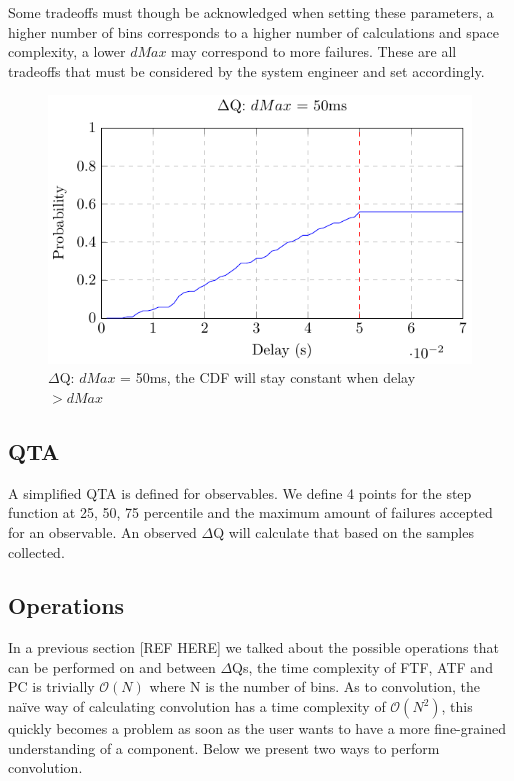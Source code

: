 Some tradeoffs must though be acknowledged when setting these parameters, a higher number of bins corresponds to a higher number of calculations and space complexity, a lower $dMax$ may correspond to more failures. These are all tradeoffs that must be considered by the system engineer and set accordingly.
    \begin{figure}[H]
        \begin{center}
            \includegraphics[scale = 1.4]{tikz/cdf_dmax.pdf}
        \end{center}
        \caption{$\Delta$Q: $dMax$ = 50ms, the CDF will stay constant when delay $> dMax$}
    \end{figure}

    \subsection{QTA}
        A simplified QTA is defined for observables. We define 4 points for the step function at 25, 50, 75 percentile and the maximum amount of failures accepted for an observable. An observed $\Delta$Q will calculate that based on the samples collected. 
\subsection{Operations}
    In a previous section [REF HERE] we talked about the possible operations that can be performed on and between $\Delta$Qs, the time complexity of FTF, ATF and PC is trivially $\mathcal{O}(N)$ where N is the number of bins. As to convolution, the naïve way of calculating convolution has a time complexity of $\mathcal{O}(N^2)$, this quickly becomes a problem as soon as the user wants to have a more fine-grained understanding of a component. Below we present two ways to perform convolution.

